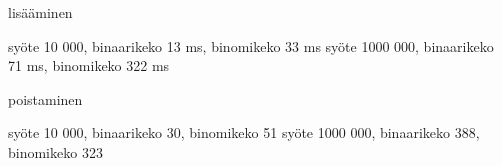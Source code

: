 lisääminen

syöte 10 000, binaarikeko 13 ms, binomikeko 33 ms
syöte 1000 000, binaarikeko  71 ms, binomikeko  322 ms

poistaminen

syöte 10 000, binaarikeko 30, binomikeko 51
syöte 1000 000, binaarikeko 388, binomikeko 323